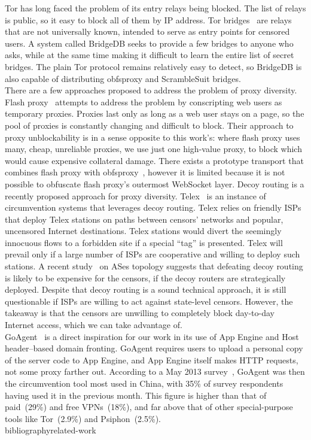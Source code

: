 \documentclass{article}  usepackage{url}
\begin{document}
Tor has long faced the problem of its entry relays being blocked. The list of
relays is public, so it easy to block all of them by IP address. Tor
bridges~\cite{tor-blocking} are relays that are not universally known, intended
to serve as entry points for censored users. A system called BridgeDB seeks to
provide a few bridges to anyone who asks, while at the same time making it
difficult to learn the entire list of secret bridges. The plain Tor protocol
remains relatively easy to detect, so BridgeDB is also capable of distributing
obfsproxy and ScrambleSuit bridges.\\

There are a few approaches proposed to address the problem of proxy diversity.
Flash proxy~\cite{flashproxy-pets12} attempts to address the problem  by
conscripting web users as temporary proxies. Proxies last only as long as a web
user stays on a page, so the pool of proxies is constantly changing and
difficult to block. Their approach to proxy unblockability is in a sense
opposite to this work's: where flash proxy uses many, cheap, unreliable proxies,
we use just one high-value proxy, to block which would cause expensive
collateral damage. There exists a prototype transport that combines flash proxy
with obfsproxy~\cite{obfs-flash}, however it is limited because it is not
possible to obfuscate flash proxy's outermost WebSocket layer. Decoy routing is
a recently proposed approach for proxy diversity. Telex~\cite{telex} is an
instance of circumvention systems that leverages decoy routing. Telex relies on
friendly ISPs that deploy Telex stations on paths between censors' networks and
popular, uncensored Internet destinations. Telex stations would divert the
seemingly  innocuous flows to a forbidden site if a special ``tag'' is
presented. Telex will prevail only if a large number of ISPs are cooperative and
willing to deploy such stations. A recent study~\cite{nodirectionhome} on ASes
topology suggests that defeating decoy routing is likely to be expensive for the
censors, if the decoy routers are strategically deployed. Despite that decoy
routing is a sound technical approach, it is still questionable if ISPs are
willing to act against state-level censors. However, the takeaway is that the
censors are unwilling to completely block day-to-day Internet access, which we
can take advantage of. \\

GoAgent~\cite{goagent} is a direct inspiration for our work in its use of App
Engine and Host header--based domain fronting. GoAgent requires users to upload
a personal copy of the server code to App Engine, and App Engine itself makes
HTTP requests, not some proxy farther out. According to a May 2013 survey~\cite
{collateral-freedom},  GoAgent was then the circumvention tool most used in
China, with 35\% of survey respondents having used it in the previous month.
This figure is higher than that of paid~(29\%) and free VPNs~(18\%), and far
above that of other special-purpose tools like Tor~(2.9\%) and Psiphon~(2.5\%).
\\


  bibliography{related-work}
\end{document}
